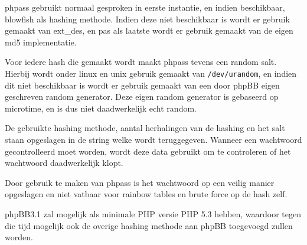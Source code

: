 phpass gebruikt normaal gesproken in eerste instantie, en indien beschikbaar, blowfish als hashing methode. Indien deze niet beschikbaar is wordt er gebruik gemaakt van ext\_des, en pas als laatste wordt er gebruik gemaakt van de eigen md5 implementatie.

Voor iedere hash die gemaakt wordt maakt phpass tevens een random salt. Hierbij wordt onder linux en unix gebruik gemaakt van \texttt{/dev/urandom}, en indien dit niet beschikbaar is wordt er gebruik gemaakt van een door phpBB eigen geschreven random generator. Deze eigen random generator is gebaseerd op microtime, en is dus niet daadwerkelijk echt random. 

De gebruikte hashing methode, aantal herhalingen van de hashing en het salt staan opgeslagen in de string welke wordt teruggegeven. Wanneer een wachtwoord gecontrolleerd moet worden, wordt deze data gebruikt om te controleren of het wachtwoord daadwerkelijk klopt.

Door gebruik te maken van phpass is het wachtwoord op een veilig manier opgeslagen en niet vatbaar voor rainbow tables en brute force op de hash zelf.

phpBB3.1 zal mogelijk als minimale PHP versie PHP 5.3 hebben, waardoor tegen die tijd mogelijk ook de overige hashing methode aan phpBB toegevoegd zullen worden. 
